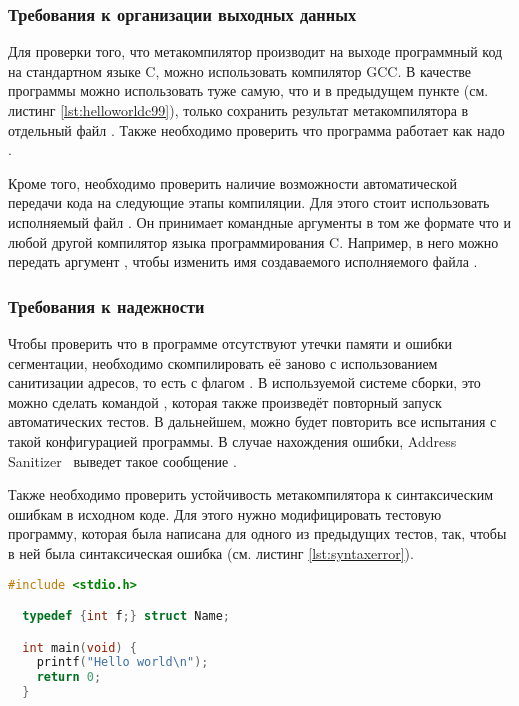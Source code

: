 \subsubsection{Требования к организации выходных данных}
Для проверки того, что метакомпилятор производит на выходе программный код на стандартном языке C, можно использовать компилятор GCC.
В качестве программы можно использовать туже самую, что и в предыдущем пункте (см. листинг \ref{lst:helloworldc99}), только сохранить результат метакомпилятора в отдельный файл .
Также необходимо проверить что программа работает как надо .

Кроме того, необходимо проверить наличие возможности автоматической передачи кода на следующие этапы компиляции.
Для этого стоит использовать исполняемый файл .
Он принимает командные аргументы в том же формате что и любой другой компилятор языка программирования C.
Например, в него можно передать аргумент , чтобы изменить имя создаваемого исполняемого файла .

\subsubsection{Требования к надежности}
Чтобы проверить что в программе отсутствуют утечки памяти и ошибки сегментации, необходимо скомпилировать её заново с использованием санитизации адресов, то есть с флагом .
В используемой системе сборки, это можно сделать командой , которая также произведёт повторный запуск автоматических тестов.
В дальнейшем, можно будет повторить все испытания с такой конфигурацией программы.
В случае нахождения ошибки, Address Sanitizer~\cite{llvmAddressSanitizerx2014} выведет такое сообщение .

Также необходимо проверить устойчивость метакомпилятора к синтаксическим ошибкам в исходном коде.
Для этого нужно модифицировать тестовую программу, которая была написана для одного из предыдущих тестов, так, чтобы в ней была синтаксическая ошибка (см. листинг \ref{lst:syntaxerror}).

\begin{lstlisting}[language=c, caption={Пример программы с синтаксической ошибкой}, label={lst:syntaxerror}]
  #include <stdio.h>

  typedef {int f;} struct Name;

  int main(void) {
    printf("Hello world\n");
    return 0;
  }
\end{lstlisting}

